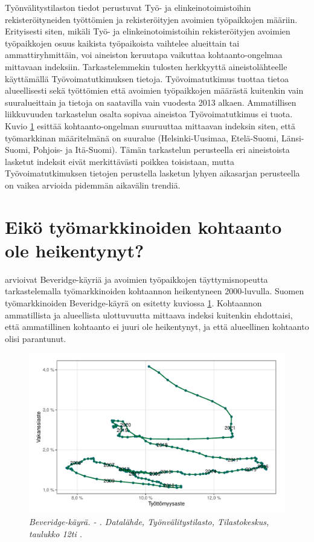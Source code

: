 \documentclass[12pt]{article}
\newcommand{\lastdatamonth}{\unskip}
\newcommand{\firstdatamonth}{\unskip}
\newcommand{\newcaption}[1]{\caption{\textit{\footnotesize{#1}}}}
\begin{document}
Työnvälitystilaston tiedot perustuvat Työ- ja elinkeinotoimistoihin rekisteröityneiden työttömien ja rekisteröityjen avoimien työpaikkojen määriin. Erityisesti siten, mikäli Työ- ja elinkeinotoimistoihin rekisteröityjen avoimien työpaikkojen osuus kaikista työpaikoista vaihtelee alueittain tai ammattiryhmittäin, voi aineiston keruutapa vaikuttaa kohtaanto-ongelmaa mittavaan indeksiin. Tarkastelemmekin tulosten herkkyyttä aineistolähteelle käyttämällä Työvoimatutkimuksen tietoja. Työvoimatutkimus tuottaa tietoa alueellisesti sekä työttömien että avoimien työpaikkojen määrästä kuitenkin vain suuralueittain ja tietoja on saatavilla vain vuodesta 2013 alkaen. Ammatillisen liikkuvuuden tarkastelun osalta sopivaa aineistoa Työvoimatutkimus ei tuota. Kuvio \ref{fig:ld0923g} esittää kohtaanto-ongelman suuruuttaa mittaavan indeksin siten, että työmarkkinan määritelmänä on suuralue (Helsinki-Uusimaa, Etelä-Suomi, Länsi-Suomi, Pohjois- ja Itä-Suomi). Tämän tarkastelun perusteella eri aineistoista lasketut indeksit eivät merkittävästi poikkea toisistaan, mutta Työvoimatutkimuksen tietojen perustella lasketun lyhyen aikasarjan perusteella on vaikea arvioida pidemmän aikavälin trendiä.

\section{Eikö työmarkkinoiden kohtaanto ole heikentynyt?} \label{section:eikö työmarkkinoiden kohtaanto ole heikentynyt}

 arvioivat Beveridge-käyriä ja avoimien työpaikkojen täyttymisnopeutta tarkastelemalla työmarkkinoiden kohtaannon heikentyneen 2000-luvulla. Suomen työmarkkinoiden Beveridge-käyrä on esitetty kuviossa \ref{fig:ld0923g}. Kohtaannon ammatillista ja alueellista ulottuvuutta mittaava indeksi kuitenkin ehdottaisi, että ammatillinen kohtaanto ei juuri ole heikentynyt, ja että alueellinen kohtaanto olisi parantunut. 

\begin{figure}
\centering
\includegraphics[scale = 0.8]{../kuviot/beveridge_curve.pdf}
    \newcaption{Beveridge-käyrä. \protect  \firstdatamonth \phantom{} - \protect\lastdatamonth. Datalähde, Työnvälitystilasto, Tilastokeskus, taulukko 12ti \protect \cite{svt2011}.}
   \label{fig:ld0923g}
\end{figure}
\end{document}
